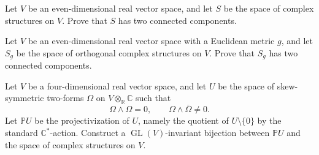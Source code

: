 \begin{exercise}
\label{exercise-all-complex-components}
Let $V$ be an even-dimensional real vector
space, and let $S$ be the space of complex
structures on $V$. Prove that $S$ has two
connected components.
\end{exercise}

\begin{exercise}
\label{exercise-orthogonal-components}
Let $V$ be an even-dimensional real vector
space with a Euclidean metric $g$, and let
$S_g$ be the space of orthogonal complex
structures on $V$. Prove that $S_g$ has two
connected components.
\end{exercise}

\begin{exercise}
\label{exercise-two-forms-complex}
Let $V$ be a four-dimensional real vector
space, and let $U$ be the space of
skew-symmetric two-forms $\Omega$ on
$V\otimes_{\mathbb{R}}\mathbb{C}$ such that
$$
\Omega\wedge\Omega=0,
\qquad
\Omega\wedge\overline{\Omega}\ne0.
$$
Let $\mathbb{P}U$ be the projectivization
of $U$, namely the quotient of
$U\setminus\{0\}$ by the standard
$\mathbb{C}^*$-action. Construct a
$\operatorname{GL}(V)$-invariant bijection
between $\mathbb{P}U$ and the space of
complex structures on $V$.
\end{exercise}

